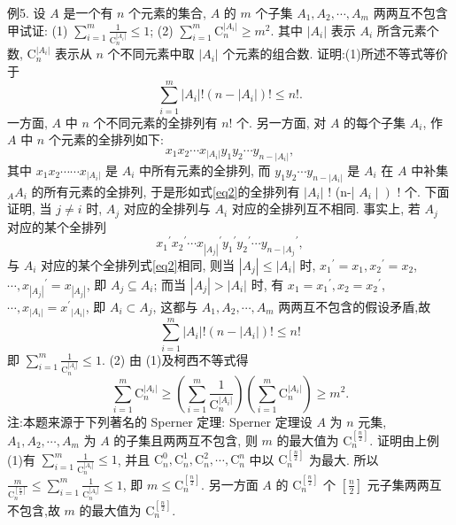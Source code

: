 例5. 设 $A$ 是一个有 $n$ 个元素的集合, $A$ 的 $m$ 个子集 $A_1, A_2, \cdots, A_m$ 两两互不包含甲试证:
(1) $\sum_{i=1}^m \frac{1}{\mathrm{C}_n^{\left|A_i\right|}} \leqslant 1$; (2) $\sum_{i=1}^m \mathrm{C}_n^{\left|A_i\right|} \geqslant m^2$.
其中 $\left|A_i\right|$ 表示 $A_i$ 所含元素个数, $\mathrm{C}_n^{\left|A_i\right|}$ 表示从 $n$ 个不同元素中取 $\left|A_i\right|$ 个元素的组合数.
证明:(1)所述不等式等价于
$$
\sum_{i=1}^m\left|A_i\right| !\left(n-\left|A_i\right|\right) ! \leqslant n ! . \label{eq1}
$$
一方面, $A$ 中 $n$ 个不同元素的全排列有 $n !$ 个.
另一方面, 对 $A$ 的每个子集 $A_i$, 作 $A$ 中 $n$ 个元素的全排列如下:
$$
x_1 x_2 \cdots x_{\left|A_i\right|} y_1 y_2 \cdots y_{n-\left|A_i\right|},  \label{eq2}
$$
其中 $x_1 x_2 \cdots \cdots x_{\left|A_i\right|}$ 是 $A_i$ 中所有元素的全排列, 而 $y_1 y_2 \cdots y_{n-\left|A_i\right|}$ 是 $A_i$ 在 $A$ 中补集 ${ }_A A_i$ 的所有元素的全排列, 于是形如式\ref{eq2}的全排列有 $\left|A_i\right|$ ! (n-| $\left.A_i \mid\right)$ ! 个.
下面证明, 当 $j \neq i$ 时, $A_j$ 对应的全排列与 $A_i$ 对应的全排列互不相同.
事实上, 若 $A_j$ 对应的某个全排列
$$
x_1{ }^{\prime} x_2{ }^{\prime} \cdots x_{\left|A_j\right|}{ }^{\prime} y_1{ }^{\prime} y_2{ }^{\prime} \cdots y_{n-\mid A_j}{ }^{\prime}, \label{eq3}
$$
与 $A_i$ 对应的某个全排列式\ref{eq2}相同, 则当 $\left|A_j\right| \leqslant\left|A_i\right|$ 时, $x_1{ }^{\prime}=x_1, x_2{ }^{\prime}=x_2$, $\cdots, x_{\left|A_j\right|}{ }^{\prime}=x_{\left|A_j\right|}$, 即 $A_j \subseteq A_i$; 而当 $\left|A_j\right|>\left|A_i\right|$ 时, 有 $x_1=x_1{ }^{\prime}, x_2=x_2{ }^{\prime}$, $\cdots, x_{\left|A_i\right|}=x^{\prime}{ }_{\left|A_i\right|}$, 即 $A_i \subset A_j$, 这都与 $A_1, A_2, \cdots, A_m$ 两两互不包含的假设矛盾,故
$$
\sum_{i=1}^m\left|A_i\right| !\left(n-\left|A_i\right|\right) ! \leqslant n !
$$
即 $\sum_{i=1}^m \frac{1}{\mathrm{C}_n^{\left|A_i\right|}} \leqslant 1$.
(2) 由 (1)及柯西不等式得
$$
\sum_{i=1}^m \mathrm{C}_n^{\left|A_i\right|} \geqslant\left(\sum_{i=1}^m \frac{1}{\mathrm{C}_n^{\left|A_i\right|}}\right)\left(\sum_{i=1}^m \mathrm{C}_n^{\left|A_i\right|}\right) \geqslant m^2 .
$$
注:本题来源于下列著名的 Sperner 定理:
Sperner 定理设 $A$ 为 $n$ 元集, $A_1, A_2, \cdots, A_m$ 为 $A$ 的子集且两两互不包含, 则 $m$ 的最大值为 $\mathrm{C}_n^{\left[\frac{n}{2}\right]}$.
证明由上例(1)有 $\sum_{i=1}^m \frac{1}{\mathrm{C}_n^{\left|A_i\right|}} \leqslant 1$, 并且 $\mathrm{C}_n^0, \mathrm{C}_n^1, \mathrm{C}_n^2, \cdots, \mathrm{C}_n^n$ 中以 $\mathrm{C}_n^{\left[\frac{n}{2}\right]}$ 为最大.
所以 $\frac{m}{\mathrm{C}_n^{\left[\frac{n}{2}\right]}} \leqslant \sum_{i=1}^m \frac{1}{\mathrm{C}_n^{\left|A_i\right|}} \leqslant 1$, 即 $m \leqslant \mathrm{C}_n^{\left[\frac{n}{2}\right]}$. 另一方面 $A$ 的 $\mathrm{C}_n^{\left[\frac{n}{2}\right]}$ 个 $\left[\frac{n}{2}\right]$ 元子集两两互不包含,故 $m$ 的最大值为 $\mathrm{C}_n^{\left[\frac{n}{2}\right]}$.



